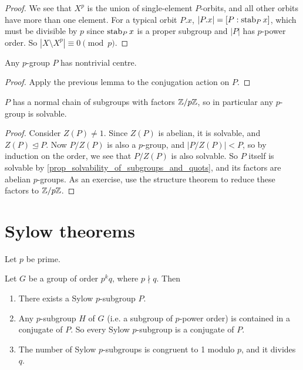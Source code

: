 \begin{proof}
    We see that $X^p$ is the union of single-element $P$-orbits, and all other orbits have more than one element. For a typical orbit $P.x$, $|P.x| = [P : \operatorname{stab}_{{P}}{{x}}]$, which must be divisible by $p$ since $\operatorname{stab}_{{P}}{{x}}$ is a proper subgroup and $|P|$ has $p$-power order. So $|X \setminus X^p| \equiv 0 \pmod{p}$.
\end{proof}

\begin{corollary}
    Any $p$-group $P$ has nontrivial centre.
\end{corollary}

\begin{proof}
    Apply the previous lemma to the conjugation action on $P$.
\end{proof}

\begin{corollary}
    $P$ has a normal chain of subgroups with factors $\mathbb{{Z}}/{{p}}\mathbb{{Z}}$, so in particular any $p$-group is solvable.
\end{corollary}

\begin{proof}
    Consider $Z(P) \neq 1$. Since $Z(P)$ is abelian, it is solvable, and $Z(P) \unlhd P$. Now $P/Z(P)$ is also a $p$-group, and $|P/Z(P)| < P$, so by induction on the order, we see that $P/Z(P)$ is also solvable. So $P$ itself is solvable by \cref{prop_solvability_of_subgroups_and_quots}, and its factors are abelian $p$-groups. As an exercise, use the structure theorem to reduce these factors to $\mathbb{{Z}}/{{p}}\mathbb{{Z}}$.
\end{proof}

\section{Sylow theorems}

Let $p$ be prime.

\begin{theorem}
    Let $G$ be a group of order $p^kq$, where $p \nmid q$. Then
    \begin{enumerate}[label=(\alph*)]
        \item There exists a Sylow $p$-subgroup $P$.
        \item Any $p$-subgroup $H$ of $G$ (i.e. a subgroup of $p$-power order) is contained in a conjugate of $P$. So every Sylow $p$-subgroup is a conjugate of $P$.
        \item The number of Sylow $p$-subgroups is congruent to 1 modulo $p$, and it divides $q$.
    \end{enumerate}
\end{theorem}

